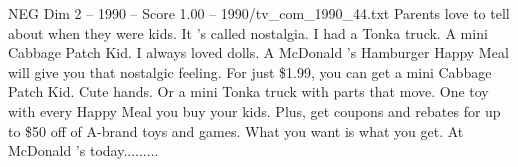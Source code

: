 \begin{textsample}{NEG Dim 2 – 1990 – Score 1.00 – 1990/tv\_com\_1990\_44.txt}  \label{ex:f2_neg_070}
Parents love to tell about when they were kids.
It 's called nostalgia.
I had a Tonka truck.
A mini Cabbage Patch Kid.
I always loved dolls.
A McDonald 's Hamburger Happy Meal will give you that nostalgic feeling.
For just \$1.99, you can get a mini Cabbage Patch Kid.
Cute hands.
Or a mini Tonka truck with parts that move.
One toy with every Happy Meal you buy your kids.
Plus, get coupons and rebates for up to \$50 off of A-brand toys and games.
What you want is what you get.
At McDonald 's today.........

\end{textsample}

